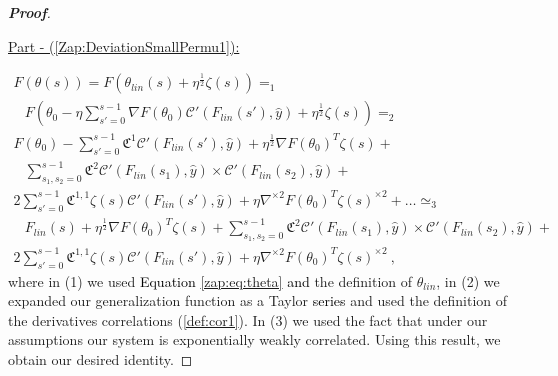 \documentclass{article} %
\begin{document}
\begin{proof}[\textbf{Proof}]
\

\underline{Part - (\ref{Zap:DeviationSmallPermu1}):}

\begin{equation}
\begin{array}{c}
F\left(\theta\left(s\right)\right)=F\left(\theta_{lin}\left(s\right)+\eta^{\frac{1}{2}}\zeta\left(s\right)\right)=_{1}\\
\begin{array}{c}
\\
\\
\end{array}F\left(\theta_{0}-\eta\sum_{s'=0}^{s-1}\nabla F\left(\theta_{0}\right)\mathcal{C}'\left(F_{lin}\left(s'\right),\hat{y}\right)+\eta^{\frac{1}{2}}\zeta\left(s\right)\right)=_{2}\\
F\left(\theta_{0}\right)-\sum_{s'=0}^{s-1}\mathfrak{C}^{1}\mathcal{C}'\left(F_{lin}\left(s'\right),\hat{y}\right)+\eta^{\frac{1}{2}}\nabla F\left(\theta_{0}\right)^{T}\zeta\left(s\right)+\\
\begin{array}{c}
\\
\\
\end{array}\sum_{s_{1},s_{2}=0}^{s-1}\mathfrak{C}^{2}\mathcal{C}'\left(F_{lin}\left(s_{1}\right),\hat{y}\right)\times\mathcal{C}'\left(F_{lin}\left(s_{2}\right),\hat{y}\right)+\\
2\sum_{s'=0}^{s-1}\mathfrak{C}^{1,1}\zeta\left(s\right)\mathcal{C}'\left(F_{lin}\left(s'\right),\hat{y}\right)+\eta\nabla^{\times2}F\left(\theta_{0}\right)^{T}\zeta\left(s\right)^{\times2}+\ldots\simeq_{3}\\
\begin{array}{c}
\\
\\
\end{array}F_{lin}\left(s\right)+\eta^{\frac{1}{2}}\nabla F\left(\theta_{0}\right)^{T}\zeta\left(s\right)+\sum_{s_{1},s_{2}=0}^{s-1}\mathfrak{C}^{2}\mathcal{C}'\left(F_{lin}\left(s_{1}\right),\hat{y}\right)\times\mathcal{C}'\left(F_{lin}\left(s_{2}\right),\hat{y}\right)+\\
2\sum_{s'=0}^{s-1}\mathfrak{C}^{1,1}\zeta\left(s\right)\mathcal{C}'\left(F_{lin}\left(s'\right),\hat{y}\right)+\eta\nabla^{\times2}F\left(\theta_{0}\right)^{T}\zeta\left(s\right)^{\times2} \ ,
\end{array}
\end{equation}
where in (1) we used \textcolor{black}{Equation} \ref{zap:eq:theta} \textcolor{black}{and} the definition of \(\theta_{lin}\), in (2) we expanded our generalization function as a Taylor \textcolor{black}{series} and used the definition of the derivatives correlations (\ref{def:cor1}). In (3) we used the fact that under our assumptions our system is exponentially weakly correlated. Using this result, we obtain our desired identity.


\end{proof}
\end{document}
